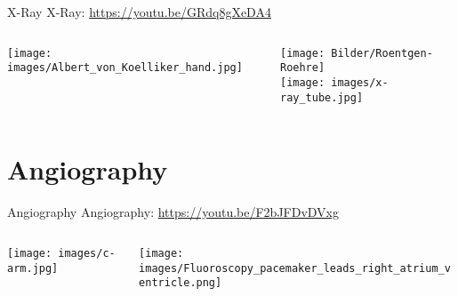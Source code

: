 \begin{frame}[c]{X-Ray}
X-Ray: \href{https://youtu.be/GRdq8gXeDA4}{https://youtu.be/GRdq8gXeDA4}
\begin{columns}[c, onlytextwidth]
  \begin{column}[c]{0.55\textwidth}
		\centering{}
		\texttt{[image: images/Albert\_von\_Koelliker\_hand.jpg]}
	\end{column}\begin{column}{0.45\textwidth}
		\centering{}
		\texttt{[image: Bilder/Roentgen-Roehre]}\\ %
		\texttt{[image: images/x-ray\_tube.jpg]}
	\end{column}
\end{columns}


\end{frame}

\section{Angiography}

\begin{frame}[c]{Angiography}
	Angiography: \href{https://youtu.be/F2bJFDvDVxg}{https://youtu.be/F2bJFDvDVxg}
	\begin{columns}[c, onlytextwidth]
		\begin{column}{0.6\textwidth}
			\centering{}
			\texttt{[image: images/c-arm.jpg]}\\
		\end{column}\begin{column}{0.4\textwidth}
			\centering{}
			\texttt{[image: images/Fluoroscopy\_pacemaker\_leads\_right\_atrium\_ventricle.png]}
		\end{column}
	\end{columns}


\end{frame}

